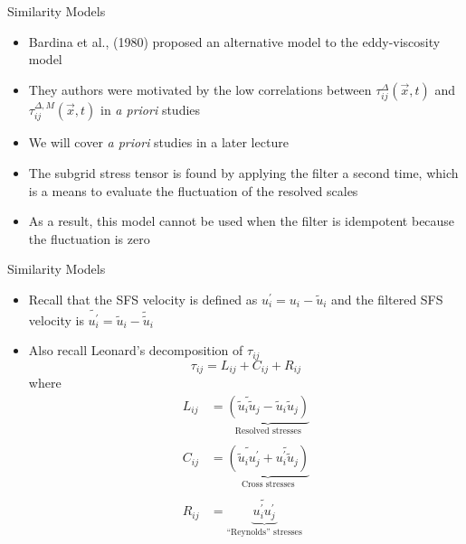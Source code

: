 \begin{frame}{Similarity Models}
\begin{itemize}
	\item Bardina et al., (1980) proposed an alternative model to the eddy-viscosity model
	\item They authors were motivated by the low correlations between $\tau_{ij}^{\Delta}(\vec{x},t)$ and $\tau_{ij}^{\Delta,M}(\vec{x},t)$ in \textit{a priori} studies
	\item We will cover \textit{a priori} studies in a later lecture
	\item The subgrid stress tensor is found by applying the filter a second time, which is a means to evaluate the fluctuation of the resolved scales
	\item As a result, this model cannot be used when the filter is idempotent because the fluctuation is zero
\end{itemize}

\end{frame}



\begin{frame}{Similarity Models}
\begin{itemize}
	\item Recall that the SFS velocity is defined as $u_i^\prime = u_i - \widetilde{u}_i$ and the filtered SFS velocity is $\widetilde{u_i^\prime} = \widetilde{u}_i - \widetilde{\widetilde{u}}_i$
	\item Also recall Leonard's decomposition of $\tau_{ij}$
	$$\tau_{ij} = L_{ij} + C_{ij} + R_{ij}$$
	where
	\begin{align*}
	L_{ij} &= \underbrace{\left(\widetilde{\widetilde{u}_i\widetilde{u}_j} - \widetilde{u}_i \widetilde{u}_j\right)	}_{\text{Resolved stresses}}\\\\
	C_{ij} &= \underbrace{\left(\widetilde{\widetilde{u}_i u_j^\prime} +\widetilde{u_i^\prime \widetilde{u}_j}\right)}_{\text{Cross stresses}}\\\\
	R_{ij} &= \underbrace{\widetilde{u_i^\prime u_j^\prime}}_{\text{``Reynolds'' stresses}}
	\end{align*}

\end{itemize}

\end{frame}

